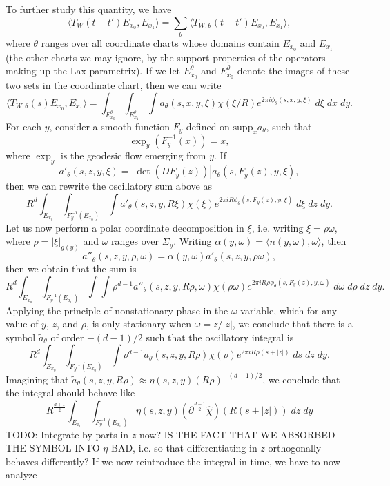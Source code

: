 To further study this quantity, we have
%
\[ \langle T_W(t-t') E_{x_0}, E_{x_1} \rangle = \sum_\theta \langle T_{W,\theta}(t-t') E_{x_0}, E_{x_1} \rangle, \]
%
where $\theta$ ranges over all coordinate charts whose domains contain $E_{x_0}$ and $E_{x_1}$ (the other charts we may ignore, by the support properties of the operators making up the Lax parametrix).  If we let $E_{x_0}^\theta$ and $E_{x_0}^\theta$ denote the images of these two sets in the coordinate chart, then we can write
%
\[ \langle T_{W,\theta}(s) E_{x_0}, E_{x_1} \rangle = \int_{E_{x_0}^\theta} \int_{E_{x_1}^\theta} \int a_\theta(s,x,y,\xi) \chi(\xi / R) e^{2 \pi i \phi_\theta(s,x,y,\xi)}\; d\xi\; dx\; dy. \]
%
For each $y$, consider a smooth function $F_y$ defined on $\text{supp}_x a_\theta$, such that
%
\[ \exp_y(F_y^{-1}(x)) = x, \]
%
where $\exp_y$ is the geodesic flow emerging from $y$. If
%
\[ a'_\theta(s,z,y,\xi) = |\det(DF_y(z))| a_\theta(s,F_y(z),y,\xi), \]
%
then we can rewrite the oscillatory sum above as
%
\[ R^d \int_{E_{x_0}} \int_{F_y^{-1}(E_{x_0})} \int a'_\theta(s,z,y,R \xi) \chi(\xi) e^{2 \pi i R \phi_\theta(s,F_y(z),y,\xi)}\; d\xi\; dz\; dy. \]
%
Let us now perform a polar coordinate decomposition in $\xi$, i.e. writing $\xi = \rho \omega$, where $\rho = |\xi|_{g(y)}$ and $\omega$ ranges over $\Sigma_y$. Writing $\alpha(y,\omega) = \langle n(y,\omega), \omega \rangle$, then
%
\[ a''_\theta(s,z,y,\rho,\omega) = \alpha(y,\omega) a'_\theta(s,z,y,\rho \omega), \]
%
then we obtain that the sum is
%
\[ R^d \int_{E_{x_0}} \int_{F_y^{-1}(E_{x_0})} \int \int \rho^{d-1} a''_\theta(s,z,y,R \rho, \omega) \chi(\rho \omega) e^{2 \pi i R \rho \phi_\theta(s,F_y(z),y,\omega)}\; d\omega\; d\rho\; dz\; dy. \]
%
Applying the principle of nonstationary phase in the $\omega$ variable, which for any value of $y$, $z$, and $\rho$, is only stationary when $\omega = z / |z|$, we conclude that there is a symbol $\tilde{a}_\theta$ of order $-(d-1)/2$ such that the oscillatory integral is
%
\[ R^d \int_{E_{x_0}} \int_{F_y^{-1}(E_{x_0})} \int \rho^{d-1} \tilde{a}_\theta(s,z,y,R \rho) \chi(\rho) e^{2 \pi i R \rho (s + |z|)}\; ds\; dz\; dy. \]
%
Imagining that $\tilde{a}_\theta(s,z,y, R \rho) \approx \eta(s,z,y) (R \rho)^{-(d-1)/2}$, we conclude that the integral should behave like
%
\[ R^{\frac{d+1}{2}} \int_{E_{x_0}} \int_{F_y^{-1}(E_{x_0})} \eta(s,z,y) (\partial^{\frac{d-1}{2}} \widehat{\chi})(R(s + |z|))\; dz\; dy \]
%
TODO: Integrate by parts in $z$ now? IS THE FACT THAT WE ABSORBED THE SYMBOL INTO $\eta$ BAD, i.e. so that differentiating in $z$ orthogonally behaves differently? If we now reintroduce the integral in time, we have to now analyze
